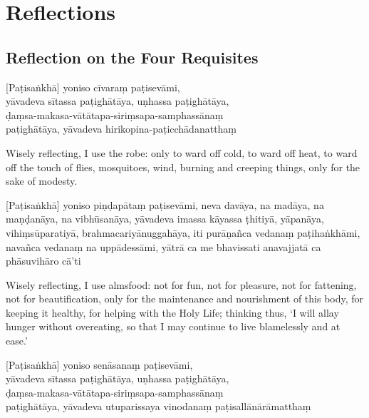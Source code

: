 \chapter{Reflections}


\section{Reflection on the Four Requisites}

\begin{leader}
\end{leader}


[Paṭisaṅkhā] yoniso cīvaraṃ paṭisevāmi,\\
yāvadeva sītassa paṭighātāya, uṇhassa paṭighātāya,\\
ḍaṃsa-makasa-vātātapa-siriṃsapa-samphassānaṃ\\
paṭighātāya, yāvadeva hirikopina-paṭicchādanatthaṃ

\begin{english}
  Wisely reflecting, I use the robe: only to ward off cold, to ward off heat, to
  ward off the touch of flies, mosquitoes, wind, burning and creeping things,
  only for the sake of modesty.
\end{english}

[Paṭisaṅkhā] yoniso piṇḍapātaṃ paṭisevāmi, neva davāya, na madāya, na maṇḍanāya,
na vibhūsanāya, yāvadeva imassa kāyassa ṭhitiyā, yāpanāya, vihiṃsūparatiyā,
brahmacariyānuggahāya, iti purāṇañca vedanaṃ paṭihaṅkhāmi, navañca vedanaṃ na
uppādessāmi, yātrā ca me bhavissati anavajjatā ca phāsuvihāro cā'ti

\begin{english}
  Wisely reflecting, I use almsfood: not for fun, not for pleasure, not for
  fattening, not for beautification, only for the maintenance and nourishment of
  this body, for keeping it healthy, for helping with the Holy Life; thinking
  thus, `I will allay hunger without overeating, so that I may continue to live
  blamelessly and at ease.'
\end{english}

[Paṭisaṅkhā] yoniso senāsanaṃ paṭisevāmi,\\
yāvadeva sītassa paṭighātāya, uṇhassa paṭighātāya,\\
ḍaṃsa-makasa-vātātapa-siriṃsapa-samphassānaṃ\\
paṭighātāya, yāvadeva utuparissaya vinodanaṃ paṭisallānārāmatthaṃ

